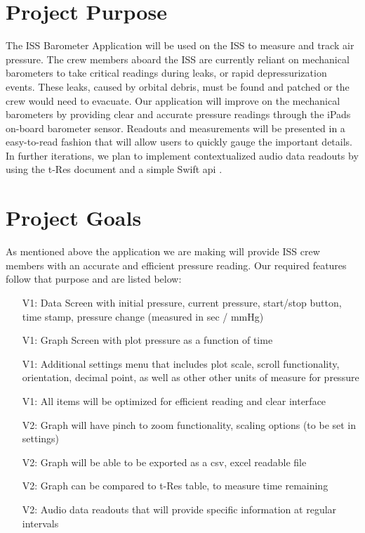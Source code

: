 \documentclass[onecolumn, draftclsnofoot,10pt, compsoc]{IEEEtran}
\begin{document}
\newpage
{}
\tableofcontents
\clearpage

\section{Project Purpose}
The ISS Barometer Application will be used on the ISS to measure and track air pressure.
The crew members aboard the ISS are currently reliant on mechanical barometers to take critical readings during leaks, or rapid depressurization events.
These leaks, caused by orbital debris, must be found and patched or the crew would need to evacuate.
Our application will improve on the mechanical barometers by providing clear and accurate pressure readings through the iPads on-board barometer sensor.
Readouts and measurements will be presented in a easy-to-read fashion that will allow users to quickly gauge the important details.
In further iterations, we plan to implement contextualized audio data readouts by using the t-Res document and a simple Swift api \cite{probStat}.

\section{Project Goals}
As mentioned above the application we are making will provide ISS crew members with an accurate and efficient pressure reading.
Our required features follow that purpose and are listed below:
\begin{itemize}
\item[V1:] Data Screen with initial pressure, current pressure, start/stop button, time stamp, pressure change (measured in sec / mmHg)
\item[V1:] Graph Screen with plot pressure as a function of time
\item[V1:] Additional settings menu that includes plot scale, scroll functionality, orientation, decimal point, as well as other other units of measure for pressure
\item[V1:] All items will be optimized for efficient reading and clear interface
\item[V2:] Graph will have pinch to zoom functionality, scaling options (to be set in settings)
\item[V2:] Graph will be able to be exported as a csv, excel readable file
\item[V2:] Graph can be compared to t-Res table, to measure time remaining
\item[V2:] Audio data readouts that will provide specific information at regular intervals
\end{itemize}
\end{document}
